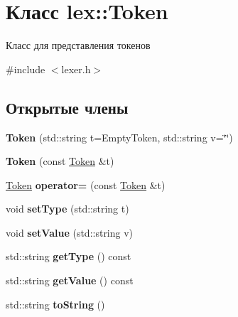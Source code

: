 \hypertarget{classlex_1_1_token}{}\section{Класс lex\+:\+:Token}
\label{classlex_1_1_token}


Класс для представления токенов  




{\ttfamily \#include $<$lexer.\+h$>$}

\subsection*{Открытые члены}
\begin{DoxyCompactItemize}
\item 
\mbox{\label{classlex_1_1_token_ac28ed9f374c77e8864228bad85147e2d}} 
{\bfseries Token} (std\+::string t=Empty\+Token, std\+::string v=\char`\"{}\char`\"{})
\item 
\mbox{\label{classlex_1_1_token_a88167e3c7b38b352ce8c81e9ac749984}} 
{\bfseries Token} (const \mbox{\hyperlink{classlex_1_1_token}{Token}} \&t)
\item 
\mbox{\label{classlex_1_1_token_a9da30188726e39500e788468eb23df9a}} 
\mbox{\hyperlink{classlex_1_1_token}{Token}} {\bfseries operator=} (const \mbox{\hyperlink{classlex_1_1_token}{Token}} \&t)
\item 
\mbox{\label{classlex_1_1_token_a2280278ca752c21586f291dcdcaac48b}} 
void {\bfseries set\+Type} (std\+::string t)
\item 
\mbox{\label{classlex_1_1_token_ab2e13a9b952b3afa6fe648d6b81e64a5}} 
void {\bfseries set\+Value} (std\+::string v)
\item 
\mbox{\label{classlex_1_1_token_a453e2166e84666bd9fc9e34902697cc3}} 
std\+::string {\bfseries get\+Type} () const
\item 
\mbox{\label{classlex_1_1_token_a6ae0d659e65ed2a6e89a45ae71261f4f}} 
std\+::string {\bfseries get\+Value} () const
\item 
\mbox{\label{classlex_1_1_token_ad242c74b8fefa40878754b4d1d3ee245}} 
std\+::string {\bfseries to\+String} ()
\end{DoxyCompactItemize}

